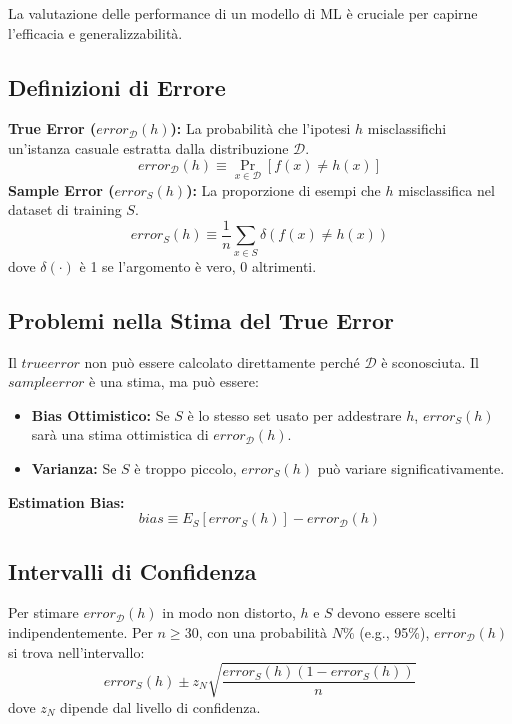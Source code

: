 \documentclass[a4paper,11pt]{article}
\begin{document}
La valutazione delle performance di un modello di ML è cruciale per capirne l'efficacia e generalizzabilità.

\subsection{Definizioni di Errore}
\noindent\textbf{True Error ($error_{\mathcal{D}}(h)$):} La probabilità che l'ipotesi $h$ misclassifichi un'istanza casuale estratta dalla distribuzione $\mathcal{D}$.
\begin{equation}
    error_{\mathcal{D}}(h) \equiv \Pr_{x \in \mathcal{D}}[f(x) \neq h(x)]
\end{equation}
\noindent\textbf{Sample Error ($error_S(h)$):} La proporzione di esempi che $h$ misclassifica nel dataset di training $S$.
\begin{equation}
    error_S(h) \equiv \frac{1}{n} \sum_{x \in S} \delta(f(x) \neq h(x))
\end{equation}
dove $\delta(\cdot)$ è 1 se l'argomento è vero, 0 altrimenti.

\subsection{Problemi nella Stima del True Error}
Il $true error$ non può essere calcolato direttamente perché $\mathcal{D}$ è sconosciuta. Il $sample error$ è una stima, ma può essere:
\begin{itemize}
    \item \textbf{Bias Ottimistico:} Se $S$ è lo stesso set usato per addestrare $h$, $error_S(h)$ sarà una stima ottimistica di $error_{\mathcal{D}}(h)$.
    \item \textbf{Varianza:} Se $S$ è troppo piccolo, $error_S(h)$ può variare significativamente.
\end{itemize}
\noindent\textbf{Estimation Bias:}
\begin{equation}
    bias \equiv E_S[error_S(h)] - error_{\mathcal{D}}(h)
\end{equation}

\subsection{Intervalli di Confidenza}
Per stimare $error_{\mathcal{D}}(h)$ in modo non distorto, $h$ e $S$ devono essere scelti indipendentemente. Per $n \ge 30$, con una probabilità $N\%$ (e.g., 95\%), $error_{\mathcal{D}}(h)$ si trova nell'intervallo:
\begin{equation}
    error_S(h) \pm z_N \sqrt{\frac{error_S(h)(1 - error_S(h))}{n}}
\end{equation}
dove $z_N$ dipende dal livello di confidenza.
\end{document}
